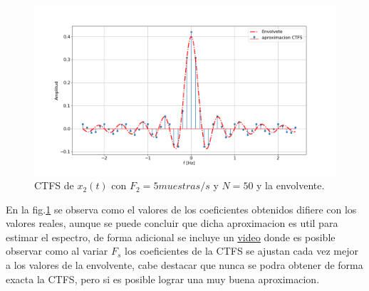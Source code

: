 \documentclass[letterpaper]{article}
\begin{document}
    \begin{figure}[H]
        \centering
        \includegraphics[width=\textwidth]{Img/punto_2_g_2.png}
        \caption{CTFS de $x_2(t)$ con $F_2=5 muestras/s$ y $N=50$ y la envolvente.}
        \label{fig.2gii}
    \end{figure}

    En la fig.\ref{fig.2gii} se observa como el valores de los coeficientes obtenidos difiere con los valores reales,
    aunque se puede concluir que dicha aproximacion es util para estimar el espectro, de forma adicional se incluye un \href{https://drive.google.com/open?id=10pVC59n6z_zfX6Qlm4w96l_1q3lnr2g6}{\underline{video}}
    donde es posible observar como al variar $F_s$ los coeficientes de la CTFS se ajustan cada vez mejor a los valores de la envolvente, cabe destacar que nunca se podra obtener de forma 
    exacta la CTFS, pero si es posible lograr una muy buena aproximacion.
\end{document}
